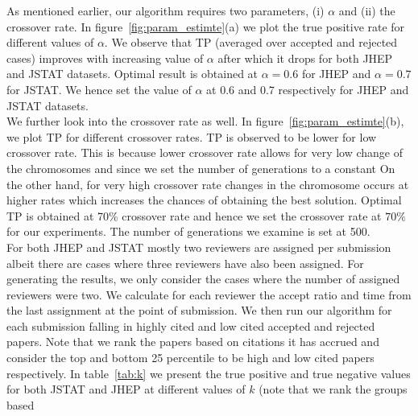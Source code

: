 

As mentioned earlier, our algorithm requires two parameters, (i) $\alpha$ and (ii) the crossover rate. In figure~\ref{fig:param_estimte}(a) we plot the true positive rate 
for different values of $\alpha$. We observe that TP (averaged over accepted and rejected cases) improves with increasing value of $\alpha$ after which it drops for 
both JHEP and JSTAT datasets. Optimal result is obtained at $\alpha = 0.6$ for JHEP and $\alpha = 0.7$ for JSTAT. 
We hence set the value of $\alpha$ at 0.6 and 0.7 respectively for JHEP and JSTAT datasets. \\
We further look into the crossover rate as well. In figure~\ref{fig:param_estimte}(b), we plot TP for different crossover rates. TP is observed to be lower for 
low crossover rate. This is because lower crossover rate allows for very low change of the chromosomes and since we set the number of generations to a constant  On the other hand, for very high crossover rate changes in the chromosome occurs at higher rates which increases the chances of obtaining the best solution. 
Optimal TP is obtained at 70\% crossover rate and hence we set the crossover rate at $70\%$ for our experiments. The number of generations we examine is set at 500.\\ 
For both JHEP and JSTAT mostly two reviewers are assigned per submission albeit there are cases where three reviewers have also been assigned. 
For generating the results, we only consider the cases where the number of assigned reviewers were two. We calculate for each reviewer the accept ratio and time from the last assignment at the point of submission. 
We then run our algorithm for each submission falling in highly cited and low cited accepted and rejected papers. 
Note that we rank the papers based on citations it has accrued and consider the top and bottom 25 percentile 
to be high and low cited papers respectively. 
In table~\ref{tab:k} we present the true positive and true negative values for both JSTAT and JHEP at different values of $k$ (note that we rank the groups based 

